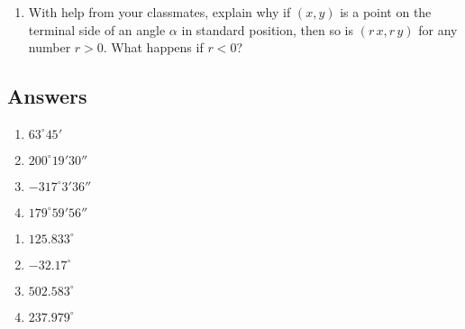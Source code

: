 \begin{enumerate}

\setcounter{enumi}{\value{HW}}

\item With help from your classmates, explain why if $(x,y)$ is a point on the terminal side of an angle $\alpha$ in standard position, then so is $(r\,x, r\,y)$ for any number $r > 0$.  What happens if $r < 0$?

\end{enumerate}

\newpage

\subsection{Answers}

\begin{multicols}{4}

\begin{enumerate}

\item $63^{\circ} 45'$
\item $200^{\circ} 19' 30''$
\item $-317^{\circ} 3' 36''$
\item $179^{\circ} 59' 56''$

\setcounter{HW}{\value{enumi}}

\end{enumerate}

\end{multicols}

\begin{multicols}{4}

\begin{enumerate}

\setcounter{enumi}{\value{HW}}

\item $125.833^{\circ}$
\item $-32.17^{\circ}$
\item $502.583^{\circ}$
\item $237.979^{\circ}$

\setcounter{HW}{\value{enumi}}

\end{enumerate}

\end{multicols}

